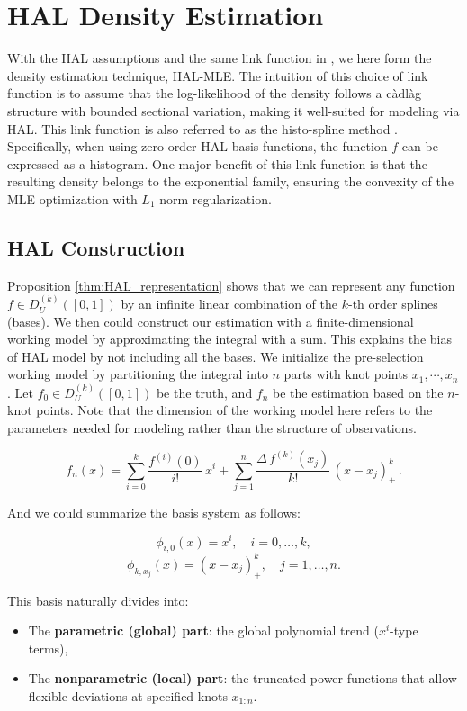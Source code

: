 \section{HAL Density Estimation} \label{HAL Density Estimation}
With the HAL assumptions and the same link function in \citet{kooperberg1992logspline}, we here form the density estimation technique, HAL-MLE. The intuition of this choice of link function is to assume that the log-likelihood of the density follows a càdlàg structure with bounded sectional variation, making it well-suited for modeling via HAL. This link function is also referred to as the histo-spline method \citep{leonard1978density, silverman1982estimation}. Specifically, when using zero-order HAL basis functions, the function \( f \) can be expressed as a histogram. One major benefit of this link function is that the resulting density belongs to the exponential family, ensuring the convexity of the MLE optimization with $L_1$ norm regularization.

\subsection{HAL Construction} \label{Estimation Construction}
Proposition \ref{thm:HAL_representation} shows that we can represent any function $f \in D^{(k)}_U([0,1])$ by an infinite linear combination of the $k$-th order splines (bases). We then could construct our estimation with a finite-dimensional working model by approximating the integral with a sum. This explains the bias of HAL model by not including all the bases. We initialize the pre-selection working model by partitioning the integral into $n$ parts with knot points $x_1, \cdots, x_n$. Let $f_0\in D^{(k)}_U([0,1])$ be the truth, and $f_n$ be the estimation based on the $n$-knot points. Note that the dimension of the working model here refers to the parameters needed for modeling rather than the structure of observations.

\[
  f_n(x)
  = \sum_{i=0}^k \frac{f^{(i)}(0)}{i!}\,x^i
    + \sum_{j =1}^n \frac{\Delta\,f^{(k)}(x_j)}{k!}\,(x-x_j)_+^k \,.
\]

And we could summarize the basis system as follows:

\[
\phi_{i,0}(x) =  x^i, \quad i = 0, \ldots, k,
\]
\[
\phi_{k,x_j}(x) = (x - x_j)_+^k, \quad j = 1, \ldots, n.
\] \label{basis_d1}

This basis naturally divides into:
\begin{itemize}
    \item The \textbf{parametric (global) part}: the global polynomial trend ($x^i$-type terms),
    \item The \textbf{nonparametric (local) part}: the truncated power functions that allow flexible deviations at specified knots $x_{1:n}$.
\end{itemize}

